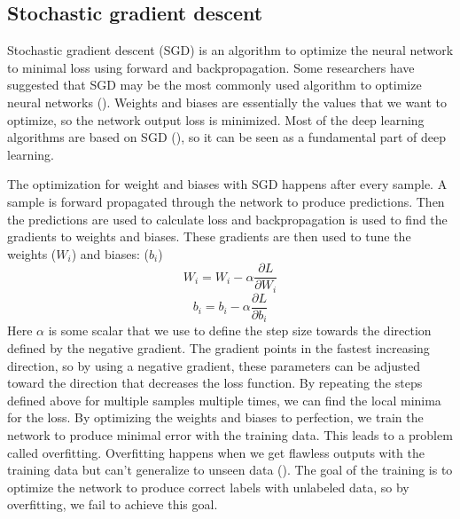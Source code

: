 \subsection{Stochastic gradient descent}

Stochastic gradient descent (SGD) is an algorithm to optimize the neural network to minimal loss using forward and backpropagation. Some researchers have suggested that SGD may be the most commonly used algorithm to optimize neural networks (\cite{NIPS2012_6aca9700}). Weights and biases are essentially the values that we want to optimize, so the network output loss is minimized. Most of the deep learning algorithms are based on SGD (\cite{Goodfellow-et-al-2016}), so it can be seen as a fundamental part of deep learning.

The optimization for weight and biases with SGD happens after every sample. A sample is forward propagated through the network to produce predictions. Then the predictions are used to calculate loss and backpropagation is used to find the gradients to weights and biases. These gradients are then used to tune the weights (\(W_{i}\)) and biases: (\(b_{i}\))
\[W_{i} = W_{i} - \alpha \frac{\partial L}{\partial W_{i}}\]
\[b_{i} = b_{i} - \alpha \frac{\partial L}{\partial b_{i}}\]
Here \(\alpha\) is some scalar that we use to define the step size towards the direction defined by the negative gradient. The gradient points in the fastest increasing direction, so by using a negative gradient, these parameters can be adjusted toward the direction that decreases the loss function. By repeating the steps defined above for multiple samples multiple times, we can find the local minima for the loss. By optimizing the weights and biases to perfection, we train the network to produce minimal error with the training data. This leads to a problem called overfitting. Overfitting happens when we get flawless outputs with the training data but can't generalize to unseen data (\cite{overfit}). The goal of the training is to optimize the network to produce correct labels with unlabeled data, so by overfitting, we fail to achieve this goal.

